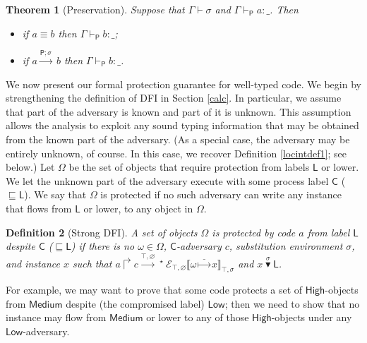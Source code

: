 \documentclass{sigplanconf}
\newcommand{\lab}{\mathsf L}
\newcommand{\labp}{\mathsf P}
\newcommand{\labc}{\mathsf C}
\newcommand{\action}[1]{\stackrel{#1}{\longrightarrow}~}
\newcommand{\store}[1]{\stackrel{#1}\mapsto}
\newcommand{\llctx}[3]{\mathcal E_{#1}\llbracket#2\rrbracket_{#3}}
\newtheorem{definition}{Definition}[section]
\newtheorem{theorem}[definition]{Theorem}
\begin{document}
\begin{theorem}[Preservation]\label{subjred}
  Suppose that $\Gamma \vdash \sigma$ and $\Gamma \vdash_{\labp} a : \_$. Then 
\begin{itemize}
\item if $a \equiv b$ then $\Gamma \vdash_{\labp} b
  : \_$;
\item if $a \action{\labp;\sigma} b$ then $\Gamma \vdash_{\labp} b : \_$.
\end{itemize}
\end{theorem}
We now present our formal protection guarantee for well-typed code. 
We begin by strengthening the definition of DFI in Section \ref{calc}. In particular, we assume that part of the adversary is known and part of it is unknown. This assumption allows the analysis to exploit any sound typing information that may be obtained from the known part of the adversary. (As a special case, the adversary may be entirely unknown, of course. In this case, we recover Definition \ref{locintdef1}; see below.) Let $\Omega$ be the set of objects that require protection from labels $\lab$ or lower. We let the unknown part of the adversary execute with some process label $\labc$ ($\sqsubseteq \lab$). 
We say that $\Omega$ is protected if no such adversary can write any instance that flows from $\lab$ or lower, to any object in $\Omega$.
\begin{definition}[Strong DFI]\label{locintdef} A set of objects $\Omega$ is protected by code $a$ from label $\lab$ despite $\labc$ ($\sqsubseteq \lab$)
  if there is no $\omega \in \Omega$, $\labc$-adversary $c$, substitution environment $\sigma$, and instance $x$ such that $a \Rsh c
  \action{\top,\varnothing}\!\!\!\!{}^\star ~\llctx{\top,\varnothing}{\omega\store{\_} x}{\top,\sigma}$ and $x\stackrel\sigma\blacktriangledown \lab$.
\end{definition}
For example, we may want to prove that some code protects a set of $\mathsf{High}$-objects from $\mathsf{Medium}$ despite (the compromised label) $\mathsf{Low}$; then we need to show that no instance may flow from $\mathsf{Medium}$ or lower to any of those $\mathsf{High}$-objects under any $\mathsf{Low}$-adversary.
\end{document}
